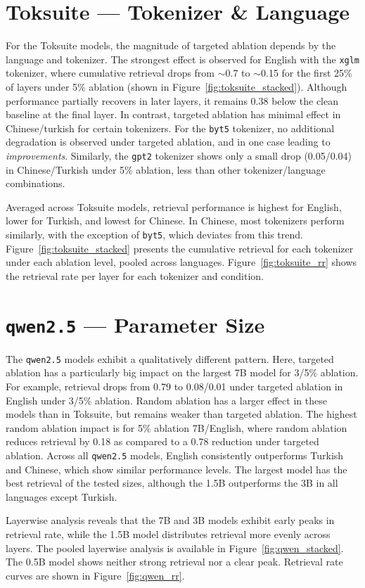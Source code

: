 


\section{Toksuite --- Tokenizer \& Language}\label{sec:results_rq2}

For the Toksuite models, the magnitude of targeted ablation depends by the language and tokenizer. The strongest effect is observed for English with the \texttt{xglm} tokenizer, where cumulative retrieval drops from $\sim$0.7 to $\sim$0.15 for the first 25\% of layers under 5\% ablation (shown in Figure~\ref{fig:toksuite_stacked}). Although performance partially recovers in later layers, it remains 0.38 below the clean baseline at the final layer. In contrast, targeted ablation has minimal effect in Chinese/turkish for certain tokenizers. For the \texttt{byt5} tokenizer, no additional degradation is observed under targeted ablation, and in one case leading to \textit{improvements}. Similarly, the \texttt{gpt2} tokenizer shows only a small drop (0.05/0.04) in Chinese/Turkish under 5\% ablation, less than other tokenizer/language combinations.

Averaged across Toksuite models, retrieval performance is highest for English, lower for Turkish, and lowest for Chinese. In Chinese, most tokenizers perform similarly, with the exception of \texttt{byt5}, which deviates from this trend. Figure~\ref{fig:toksuite_stacked} presents the cumulative retrieval for each tokenizer under each ablation level, pooled across languages. Figure~\ref{fig:toksuite_rr} shows the retrieval rate per layer for each tokenizer and condition.




\section{\texttt{qwen2.5} --- Parameter Size}\label{sec:results_rq3}

The \texttt{qwen2.5} models exhibit a qualitatively different pattern. Here, targeted ablation has a particularly big impact on the largest 7B model for 3/5\% ablation. For example, retrieval drops from 0.79 to 0.08/0.01 under targeted ablation in English under 3/5\% ablation. Random ablation has a larger effect in these models than in Toksuite, but remains weaker than targeted ablation. The highest random ablation impact is for 5\% ablation 7B/English, where random ablation reduces retrieval by 0.18 as compared to a 0.78 reduction under targeted ablation. Across all \texttt{qwen2.5} models, English consistently outperforms Turkish and Chinese, which show similar performance levels. The largest model has the best retrieval of the tested sizes, although the 1.5B outperforms the 3B in all languages except Turkish.

Layerwise analysis reveals that the 7B and 3B models exhibit early peaks in retrieval rate, while the 1.5B model distributes retrieval more evenly across layers. The pooled layerwise analysis is available in Figure~\ref{fig:qwen_stacked}. The 0.5B model shows neither strong retrieval nor a clear peak. Retrieval rate curves are shown in Figure~\ref{fig:qwen_rr}.

